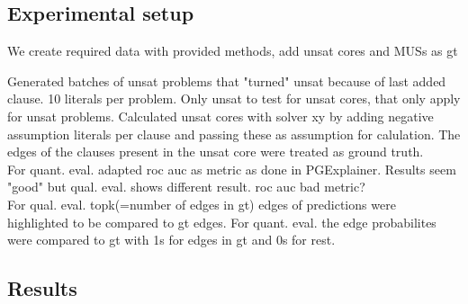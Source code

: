 \subsection{Experimental setup}

We create required data with provided methods, add unsat cores and MUSs as gt


Generated batches of unsat problems that "turned" unsat because of last added clause. 10 literals per problem. Only unsat to test for unsat cores, that only apply for unsat problems. Calculated unsat cores with solver xy by adding negative assumption literals per clause and passing these as assumption for calulation. The edges of the clauses present in the unsat core were treated as ground truth. \\


For quant. eval. adapted roc auc as metric as done in PGExplainer. Results seem "good" but qual. eval. shows different result. roc auc bad metric? \\
For qual. eval. topk(=number of edges in gt) edges of predictions were highlighted to be compared to gt edges. For quant. eval. the edge probabilites were compared to gt with 1s for edges in gt and 0s for rest. \\

\subsection{Results}
